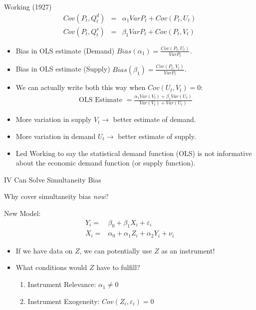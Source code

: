 \documentclass[aspectratio=169,11pt]{beamer}
\begin{document}
\begin{frame}{Working (1927)}
\small
\vspace{-0.2cm}
\begin{eqnarray*}
Cov(P_t, Q_t^d) &=& \alpha_1 Var P_t + Cov (P_t,U_t)\\
Cov(P_t, Q_t^s) &=& \beta_1 Var P_t + Cov (P_t,V_t)
\end{eqnarray*}
\vspace{-1cm}
\begin{itemize}
\item Bias in OLS estimate (Demand) $Bias(\alpha_1) = \frac{Cov(P_t,U_t)}{Var P_t}$.
\item Bias in OLS estimate (Supply) $Bias(\beta_1) = \frac{Cov(P_t,V_t)}{Var P_t}$.
\item We can actually write both this way when $Cov(U_t,V_t) = 0$:
\begin{eqnarray*}
\text{OLS Estimate }= \frac{\alpha_1 Var(V_t) + \beta_1 Var (U_t)}{Var (V_t) + Var (U_t)}
\end{eqnarray*}
\item More variation in supply $V_t \rightarrow$ better estimate of demand.
\item More variation in demand $U_t \rightarrow$ better estimate of supply.
\item Led Working to say the \alert{statistical demand function} (OLS) is not informative about the economic demand function (or supply function).
\end{itemize}
\end{frame}

\begin{frame}{IV Can Solve Simultaneity Bias}

Why cover simultaneity bias \emph{now}?

\vspace{3mm}

New Model:
\begin{align*}
	Y_i =& \beta_0 + \beta_1 X_i + \varepsilon_i\\
	X_i =& \alpha_0 + \alpha_1 Z_i + \alpha_2 Y_i + \nu_i
\end{align*}

\begin{itemize}
	\item If we have data on $Z$, we can potentially use $Z$ as an instrument!
	\item What conditions would $Z$ have to fulfill?
		\begin{enumerate}
			\item Instrument Relevance: $\alpha_1\neq 0$
			\item Instrument Exogeneity: $Cov(Z_i,\varepsilon_i)=0$
		\end{enumerate}

\end{itemize}

\end{frame}
\end{document}
